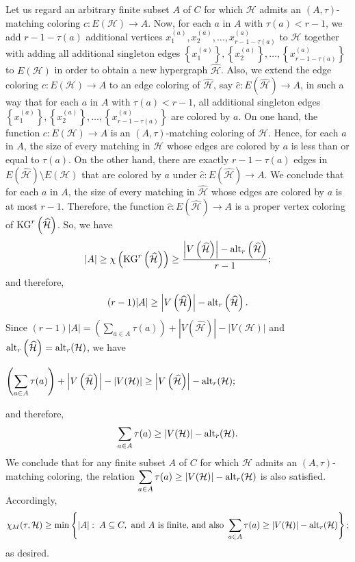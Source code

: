 \documentclass[11pt]{amsart}
\theoremstyle{definition}
\begin{document}
Let us regard an arbitrary finite subset $A$ of $C$ for which ${\mathcal H}$ admits an $(A,\tau)$-matching coloring $c: E({\mathcal H})\longrightarrow A$.
Now, for each $a$ in $A$ with $\tau(a) < r-1$, we add $r-1-\tau(a)$ additional vertices
$x^{(a)}_{1},x^{(a)}_{2},\ldots ,x^{(a)}_{r-1-\tau(a)}$ to ${\mathcal H}$
together with adding all additional singleton edges
$\left\{x^{(a)}_{1}\right\},\left\{x^{(a)}_{2}\right\},\ldots ,\left\{x^{(a)}_{r-1-\tau(a)}\right\}$ to $E({\mathcal H})$
in order to obtain a new hypergraph $\widehat{{\mathcal H}}$.
Also, we extend the edge coloring $c: E({\mathcal H})\longrightarrow A$
to an edge coloring of $\widehat{{\mathcal H}}$, say $\widehat{c}: E\left(\widehat{{\mathcal H}}\right)\longrightarrow A$, in such a way that for each $a$ in $A$ with $\tau(a) < r-1$, all additional singleton edges
$\left\{x^{(a)}_{1}\right\},\left\{x^{(a)}_{2}\right\},\ldots ,\left\{x^{(a)}_{r-1-\tau(a)}\right\}$ are colored by $a$.
On one hand, the function $c: E({\mathcal H})\longrightarrow A$ is an $(A,\tau)$-matching coloring
of ${\mathcal H}$. Hence, for each $a$ in $A$, the size of every matching in ${\mathcal H}$
whose edges are colored by $a$ is less than or equal to $\tau (a)$.
On the other hand,
there are exactly $r-1-\tau(a)$ edges in $E\left(\widehat{{\mathcal H}}\right) \setminus E({\mathcal H})$
that are colored by $a$ under $\widehat{c}: E\left(\widehat{{\mathcal H}}\right)\longrightarrow A$. We conclude that for each $a$ in $A$, the size of every matching in $\widehat{{\mathcal H}}$ whose edges are colored by $a$ is at most $r-1$. Therefore, the function
$\widehat{c}: E\left(\widehat{{\mathcal H}}\right)\longrightarrow A$
is a proper vertex coloring of ${\rm KG}^r\left(\widehat{{\mathcal H}}\right)$. So,
we have
$$|A| \geq \chi\left({\rm KG}^r\left(\widehat{{\mathcal H}}\right)\right)\geq { \left|V\left(\widehat{{\mathcal H}}\right)\right|-{\rm alt}_r\left(\widehat{{\mathcal H}}\right)\over r-1};$$
and therefore, 
$$(r-1)|A| \geq \left|V\left(\widehat{{\mathcal H}}\right)\right|-{\rm alt}_r\left(\widehat{{\mathcal H}}\right).$$
Since 
$(r-1)|A| = \left( \displaystyle\sum_{a\in A}\tau(a) \right) + \left|V\left(\widehat{{\mathcal H}}\right)\right|-|V({\mathcal H})|$ and ${\rm alt}_r\left(\widehat{{\mathcal H}}\right)={\rm alt}_r({\mathcal H})$,
we have
\begin{center}
	$\left( \displaystyle\sum_{a\in A}\tau(a) \right) + \left|V\left(\widehat{{\mathcal H}}\right)\right|-|V({\mathcal H})| \geq \left|V\left(\widehat{{\mathcal H}}\right)\right|-{\rm alt}_r({\mathcal H});$
\end{center}
and therefore,
$$\displaystyle\sum_{a\in A}\tau(a) \geq  |V({\mathcal H})|-{\rm alt}_r({\mathcal H}) .$$
We conclude that for any finite subset $A$ of $C$ for which ${\mathcal{H}}$ admits an $(A,\tau)$-matching coloring, the relation
$\displaystyle\sum_{a\in A}\tau(a) \geq  |V({\mathcal H})|-{\rm alt}_r({\mathcal H}) $ is also satisfied. Accordingly,
$$\chi_M(\tau,{\mathcal H})\geq \min \left\{|A|:\;   A \subseteq C, \mbox{ and } A \mbox{ is finite,}  \mbox{ and also } \sum_{a\in A}\tau(a) \geq  |V({\mathcal H})|-{\rm alt}_r({\mathcal H})\right\} ;$$
as desired.
\end{document}
